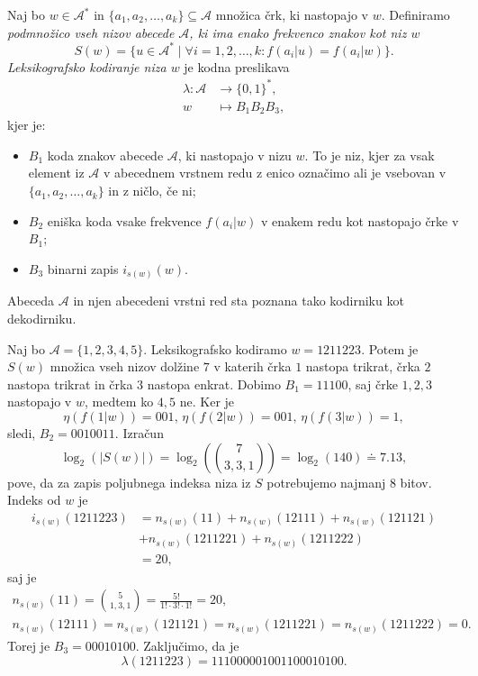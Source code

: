 \documentclass[fin1, tisk]{fmfdelo}
\providecommand{\abs}[1]{\left\lvert #1 \right\rvert}
\newcommand{\A}{\mathcal{A}}
\theoremstyle{definition}
\begin{document}
\begin{definicija}\label{def:LeksikografskoKodiranje}
    Naj bo $w \in \A^*$ in $\{a_1, a_2, \ldots, a_k \} \subseteq \A$ množica črk, ki 
    nastopajo v $w$. Definiramo \emph{podmnožico vseh nizov abecede $\A$, ki ima enako
    frekvenco znakov kot niz $w$}
    \[
        S(w) = \bigl\{ u \in \A^* \mid \forall i= 1, 2, \ldots, k \colon f(a_i|u) = f(a_i|w) \bigr\}.
    \]
    \emph{Leksikografsko kodiranje niza $w$} je kodna preslikava
    \begin{align*}
        \lambda  \colon \A &\to \{ 0, 1\}^*, \\
        w &\mapsto B_1B_2B_3,
    \end{align*}
    kjer je:
    \begin{itemize}
        \item $B_1$ koda znakov abecede $\A$, ki nastopajo v nizu $w$. To je niz, kjer
        za vsak element iz $\A$ v abecednem vrstnem redu z enico označimo ali je vsebovan
        v $\{a_1, a_2, \ldots, a_k \}$ in z ničlo, če ni;
        \item $B_2$ eniška koda vsake frekvence $f(a_i|w)$ v enakem redu kot nastopajo črke v $B_1$;
        \item $B_3$ binarni zapis $i_{s(w)}(w)$.
    \end{itemize}
    Abeceda $\A$ in njen abecedeni vrstni red sta poznana tako kodirniku kot dekodirniku.
\end{definicija}

\begin{primer}\label{primer:leksikografsko}
    Naj bo $\A = \{ 1, 2, 3, 4, 5 \}$. Leksikografsko kodiramo $w = 1211223$. Potem je $S(w)$ 
    množica vseh nizov dolžine $7$ v katerih črka $1$ nastopa trikrat, črka $2$ nastopa trikrat 
    in črka $3$ nastopa enkrat. Dobimo $B_1 = 11100$, saj črke $1,2,3$ nastopajo v $w$, medtem ko 
    $4,5$ ne. Ker je
    \[
        \eta \left( f(1|w) \right) = 001, \, \eta \left( f(2|w) \right) = 001, \,
        \eta \left( f(3|w) \right) = 1,
    \]
    sledi, $B_2 = 0010011$. Izračun
    \[
        \log_2(\abs{S(w)}) = \log_2 \left( \binom{7}{3,3,1} \right) = \log_2(140) \doteq 7.13,
    \]
    pove, da za zapis poljubnega indeksa niza iz $S$ potrebujemo najmanj $8$ bitov. 
    Indeks od $w$ je
    \begin{align*}
        i_{s(w)}(1211223) &= n_{s(w)}(11) + n_{s(w)}(12111) + n_{s(w)}(121121) \\
        &+ n_{s(w)}(1211221) + n_{s(w)}(1211222) \\
        &= 20,
    \end{align*}
    saj je
    \begin{gather*}
        n_{s(w)}(11) = \binom{5}{1,3,1} = \frac{5!}{1! \cdot 3! \cdot 1!} = 20, \\
        n_{s(w)}(12111) = n_{s(w)}(121121) = n_{s(w)}(1211221) = n_{s(w)}(1211222) = 0.
    \end{gather*}
    Torej je $B_3 = 00010100$. Zaključimo, da je
    \[
        \lambda(1211223) = 111000 0010011 00010100.
    \]
\end{primer}
\end{document}
